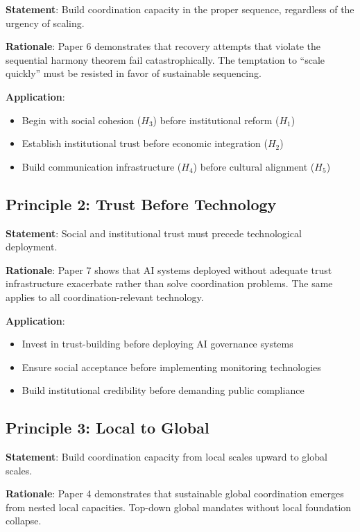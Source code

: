 \documentclass[12pt,letterpaper]{article}
\begin{document}
\textbf{Statement}: Build coordination capacity in the proper sequence, regardless of the urgency of scaling.

\textbf{Rationale}: Paper 6 demonstrates that recovery attempts that violate the sequential harmony theorem fail catastrophically. The temptation to ``scale quickly'' must be resisted in favor of sustainable sequencing.

\textbf{Application}:
\begin{itemize}
    \item Begin with social cohesion ($H_3$) before institutional reform ($H_1$)
    \item Establish institutional trust before economic integration ($H_2$)
    \item Build communication infrastructure ($H_4$) before cultural alignment ($H_5$)
\end{itemize}

\subsection{Principle 2: Trust Before Technology}

\textbf{Statement}: Social and institutional trust must precede technological deployment.

\textbf{Rationale}: Paper 7 shows that AI systems deployed without adequate trust infrastructure exacerbate rather than solve coordination problems. The same applies to all coordination-relevant technology.

\textbf{Application}:
\begin{itemize}
    \item Invest in trust-building before deploying AI governance systems
    \item Ensure social acceptance before implementing monitoring technologies
    \item Build institutional credibility before demanding public compliance
\end{itemize}

\subsection{Principle 3: Local to Global}

\textbf{Statement}: Build coordination capacity from local scales upward to global scales.

\textbf{Rationale}: Paper 4 demonstrates that sustainable global coordination emerges from nested local capacities. Top-down global mandates without local foundation collapse.
\end{document}
